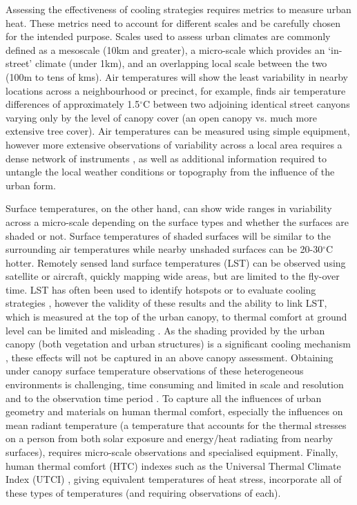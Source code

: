 \documentclass[final,3p,times,authoryear]{elsarticle}
\begin{document}
Assessing the effectiveness of cooling strategies requires metrics to measure urban heat. These metrics need to account for different scales and be carefully chosen for the intended purpose. Scales used to assess urban climates are commonly defined \citep{Oke2017} as a mesoscale (10km and greater), a micro-scale which provides an `in-street' climate (under 1km), and an overlapping local scale between the two (100m to tens of kms). Air temperatures will show the least variability in nearby locations across a neighbourhood or precinct, for example, \cite{Coutts2015} finds air temperature differences of approximately 1.5$^{\circ}$C between two adjoining identical street canyons varying only by the level of canopy cover (an open canopy vs. much more extensive tree cover). Air temperatures can be measured using simple equipment, however more extensive observations of variability across a local area requires a dense network of instruments \citep{Potgieter2021}, as well as additional information required to untangle the local weather conditions or topography from the influence of the urban form. 

Surface temperatures, on the other hand, can show wide ranges in variability across a micro-scale depending on the surface types and whether the surfaces are shaded or not. Surface temperatures of shaded surfaces will be similar to the surrounding air temperatures while nearby unshaded surfaces can be 20-30$^{\circ}$C hotter. Remotely sensed land surface temperatures (LST) can be observed using satellite or aircraft, quickly mapping wide areas, but are limited to the fly-over time. LST has often been used to identify hotspots \citep{Aniello1995} or to evaluate cooling strategies \citep{Zhu2012a,Duncan2018,Manoli2019,Ossola2021}, however the validity of these results and the ability to link LST, which is measured at the top of the urban canopy, to thermal comfort at ground level can be limited and misleading \citep{Coutts2016d}. As the shading provided by the urban canopy (both vegetation and urban structures) is a significant cooling mechanism \citep{Coutts2015,Lee2018,Krayenhoff2021}, these effects will not be captured in an above canopy assessment. Obtaining under canopy surface temperature observations of these heterogeneous environments is challenging, time consuming and limited in scale and resolution and to the observation time period \citep{Middel2019a}. To capture all the influences of urban geometry and materials on human thermal comfort, especially the influences on mean radiant temperature \citep{Kantor2011} (a temperature that accounts for the thermal stresses on a person from both solar exposure and energy/heat radiating from nearby surfaces), requires micro-scale observations and specialised equipment. Finally, human thermal comfort (HTC) indexes such as the Universal Thermal Climate Index (UTCI) \citep{Brode2012a}, giving equivalent temperatures of heat stress, incorporate all of these types of temperatures (and requiring observations of each).
\end{document}
